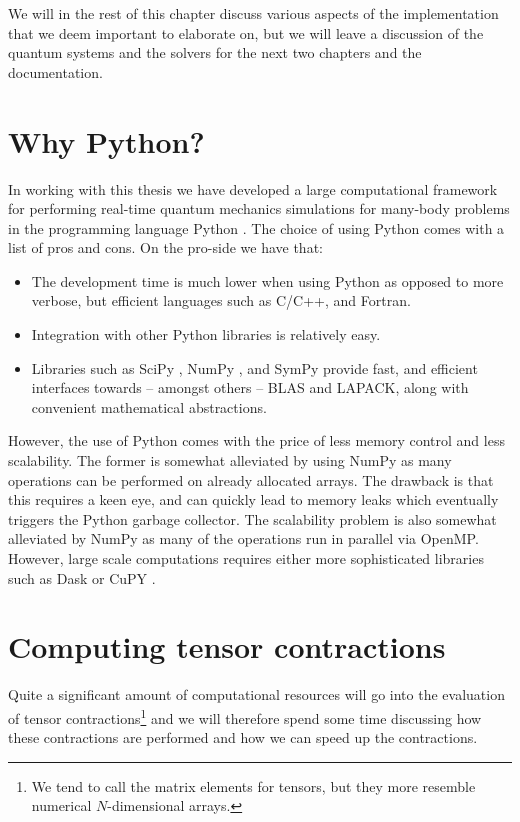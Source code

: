     We will in the rest of this chapter discuss various aspects of the
    implementation that we deem important to elaborate on, but we will leave
    a discussion of the quantum systems and the solvers for the next two
    chapters and the documentation.

    \section{Why Python?}
        In working with this thesis we have developed a large computational
        framework for performing real-time quantum mechanics simulations for
        many-body problems in the programming language Python \cite{python}.
        The choice of using Python comes with a list of pros and cons.
        On the pro-side we have that:
        \begin{itemize}
            \item The development time is much lower when using Python as
                opposed to more verbose, but efficient languages such as C/C++,
                and Fortran.
            \item Integration with other Python libraries is relatively easy.
            \item Libraries such as SciPy \cite{scipy}, NumPy \cite{numpy}, and
                SymPy \cite{sympy} provide fast, and efficient interfaces
                towards -- amongst others -- BLAS and LAPACK, along with
                convenient mathematical abstractions.
        \end{itemize}
        However, the use of Python comes with the price of less memory control
        and less scalability.
        The former is somewhat alleviated by using NumPy as many operations can
        be performed on already allocated arrays.
        The drawback is that this requires a keen eye, and can quickly lead to
        memory leaks which eventually triggers the Python garbage collector.
        The scalability problem is also somewhat alleviated by NumPy as many of
        the operations run in parallel via OpenMP.
        However, large scale computations requires either more sophisticated
        libraries such as Dask \cite{dask} or CuPY \cite{cupy}.

    \section{Computing tensor contractions}
        Quite a significant amount of computational resources will go into the
        evaluation of tensor contractions\footnote{%
            We tend to call the matrix elements for tensors, but they more
            resemble numerical $N$-dimensional arrays.%
        } and we will therefore spend some time discussing how these
        contractions are performed and how we can speed up the contractions.

